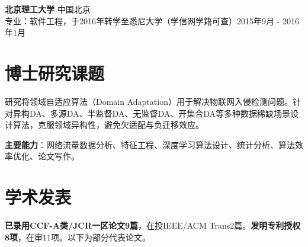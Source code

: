 \documentclass[UTF8,letterpaper,11pt]{article}
\begin{document}
\vspace{9pt}

\textbf{北京理工大学} \hfill 中国北京\\
专业：软件工程，于2016年转学至悉尼大学（学信网学籍可查）\hfill 2015年9月 - 2016年1月\\

\vspace{1pt}




\section{\textbf{博士研究课题}}

研究将领域自适应算法（Domain Adaptation）用于解决物联网入侵检测问题。针对异构DA、多源DA、半监督DA、无监督DA、开集合DA等多种数据稀缺场景设计算法，克服领域异构性，避免欠适配与负迁移效应。

\textbf{主要能力}：网络流量数据分析、特征工程、深度学习算法设计、统计分析、算法效率优化、论文写作。

\vspace{1pt}




\section{\textbf{学术发表}}

\textbf{已录用CCF-A类/JCR一区论文9篇}，在投IEEE/ACM Trans2篇。\textbf{发明专利授权8项}，在审11项。以下为部分代表论文。
\end{document}
